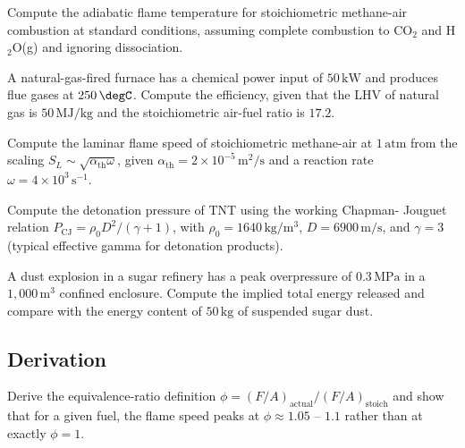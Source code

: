 \begin{exercise}
Compute the adiabatic flame temperature for stoichiometric
methane-air combustion at standard conditions, assuming complete
combustion to CO$_2$ and H$_2$O(g) and ignoring dissociation.
\end{exercise}

\begin{exercise}
A natural-gas-fired furnace has a chemical power input of $50\,
\text{kW}$ and produces flue gases at $250\,\degC$. Compute the
efficiency, given that the LHV of natural gas is $50\,\text{MJ}/
\text{kg}$ and the stoichiometric air-fuel ratio is $17.2$.
\end{exercise}

\begin{exercise}
Compute the laminar flame speed of stoichiometric methane-air at
$1\,\text{atm}$ from the scaling $S_L \sim \sqrt{\alpha_{\text{th}}
\omega}$, given $\alpha_{\text{th}} = 2 \times 10^{-5}\,\text{m}^2/
\text{s}$ and a reaction rate $\omega = 4 \times 10^3\,\text{s}^{-1}$.
\end{exercise}

\begin{exercise}
Compute the detonation pressure of TNT using the working Chapman-
Jouguet relation $P_{\text{CJ}} = \rho_0 D^2 / (\gamma + 1)$, with
$\rho_0 = 1640\,\text{kg}/\text{m}^3$, $D = 6900\,\text{m}/\text{s}$,
and $\gamma = 3$ (typical effective gamma for detonation products).
\end{exercise}

\begin{exercise}
A dust explosion in a sugar refinery has a peak overpressure of
$0.3\,\text{MPa}$ in a $1{,}000\,\text{m}^3$ confined enclosure.
Compute the implied total energy released and compare with the energy
content of $50\,\text{kg}$ of suspended sugar dust.
\end{exercise}

\subsection*{Derivation}

\begin{exercise}
Derive the equivalence-ratio definition $\phi = (F/A)_{\text{actual}}
/ (F/A)_{\text{stoich}}$ and show that for a given fuel, the flame
speed peaks at $\phi \approx 1.05$ -- $1.1$ rather than at exactly
$\phi = 1$.
\end{exercise}

